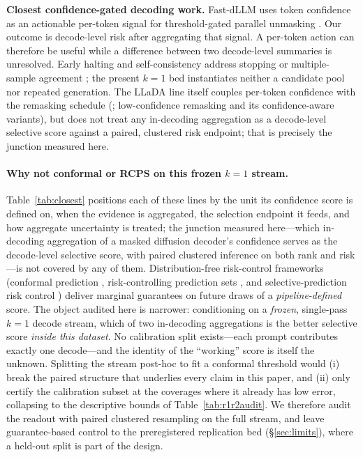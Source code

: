 \documentclass{article}
\begin{document}
\textbf{Closest confidence-gated decoding work.}
Fast-dLLM uses token confidence as an actionable per-token signal for threshold-gated parallel
unmasking \citep{wu2025fastdllm}.  Our outcome is decode-level risk after aggregating that signal.
A per-token action can therefore be useful while a difference between two decode-level summaries
is unresolved.  Early halting and self-consistency address stopping or multiple-sample agreement
\citep{halting,wang2023selfconsistency}; the present $k=1$ bed instantiates neither a candidate
pool nor repeated generation.  The LLaDA line itself couples per-token confidence with the
remasking schedule (\citealp{llda}; low-confidence remasking and its confidence-aware
variants), but does not treat any in-decoding aggregation as a decode-level selective score
against a paired, clustered risk endpoint; that is precisely the junction measured here.

\paragraph{Why not conformal or RCPS on this frozen $k=1$ stream.}
Table~\ref{tab:closest} positions each of these lines by the unit its confidence score is
defined on, when the evidence is aggregated, the selection endpoint it feeds, and how aggregate
uncertainty is treated; the junction measured here---which in-decoding aggregation of a masked
diffusion decoder's confidence serves as the decode-level selective score, with paired clustered
inference on both rank and risk---is not covered by any of them.
Distribution-free risk-control frameworks (conformal prediction
\citep{vovk2005algorithmic}, risk-controlling prediction sets
\citep{bates2021distributionfree,angelopoulos2023conformal}, and selective-prediction
risk control \citep{geifman2017selective}) deliver marginal guarantees on future draws of a
\emph{pipeline-defined} score.  The object audited here is narrower: conditioning on a
\emph{frozen}, single-pass $k=1$ decode stream, which of two in-decoding aggregations is the
better selective score \emph{inside this dataset}.  No calibration split exists---each prompt
contributes exactly one decode---and the identity of the ``working'' score is itself the
unknown.  Splitting the stream post-hoc to fit a conformal threshold would (i) break the
paired structure that underlies every claim in this paper, and (ii) only certify the
calibration subset at the coverages where it already has low error, collapsing to the
descriptive bounds of Table~\ref{tab:r1r2audit}.  We therefore audit the readout with
paired clustered resampling on the full stream, and leave guarantee-based control to the
preregistered replication bed (\S\ref{sec:limits}), where a held-out split is part of the
design.
\end{document}
